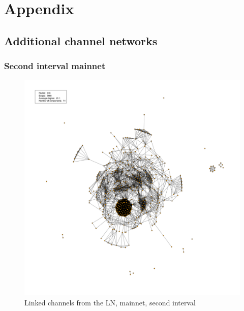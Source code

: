 \chapter{Appendix}

\section{Additional channel networks}
\label{appendix_networks}

\subsection{Second interval mainnet}

\begin{figure}[ht]
    \centering
    \includegraphics[width=14cm]{figures/graphs/cg_ln_mainnet_run2.png}
    \caption{Linked channels from the LN, mainnet, second interval}
    \label{fig:channel_network_LN_mainent2}
\end{figure}

